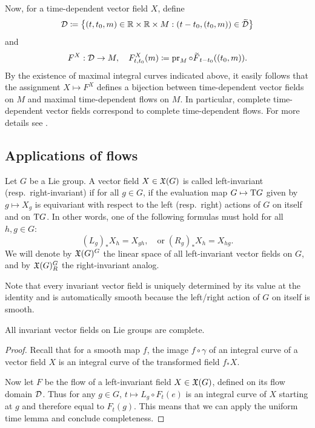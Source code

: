 \begin{rem}
    Now, for a time-dependent vector field $X$, define 
    \[\calD\coloneqq \left\{(t,t_0,m)\in\bbR\times\bbR\times M:(t-t_0,(t_0,m))\in\wt\calD\right\}\]
    and 
    \[F^X:\calD\to M,\quad F^X_{t,t_0}(m)\coloneqq \pr_M\circ \wt{F}_{t-t_0}((t_0,m)).\]
    By the existence of maximal integral curves indicated above, it easily follows that the assignment $X\mapsto F^X$ defines a bijection between time-dependent vector fields on $M$ and maximal time-dependent flows on $M$. In particular, complete time-dependent vector fields correspond to complete time-dependent flows. For more details see \cite[Sec.~3.4]{RS1}.
\end{rem}













\subsection{Applications of flows}\label{sec: applications of flows}



\begin{defn}
    Let $G$ be a Lie group. A vector field $X\in\mathfrak{X}(G)$ is called left-invariant (resp.~right-invariant) if for all $g\in G$, if the evaluation map $G\mapsto \mathrm{T} G$ given by $g\mapsto X_g$ is equivariant with respect to the left (resp.~right) actions of $G$ on itself and on $\mathrm{T} G$. In other words, one of the following formulas must hold for all $h,g\in G$:
    \[(L_g)_{\ast}X_h=X_{gh},\quad \text{or}\; (R_g)_{\ast}X_h=X_{hg}.\]
    We will denote by $\mathfrak{X}(G)^G$ the linear space of all left-invariant vector fields on $G$, and by $\mathfrak{X}(G)^G_R$ the right-invariant analog.
\end{defn}

Note that every invariant vector field is uniquely determined by its value at the identity and is automatically smooth because the left/right action of $G$ on itself is smooth.

\begin{thm}\label{thm invariant fields are complete}
    All invariant vector fields on Lie groups are complete.
\end{thm}
\begin{proof}
    Recall that for a smooth map $f$, the image $f\circ\gamma$ of an integral curve of a vector field $X$ is an integral curve of the transformed field $f_\ast X$. 
    
    Now let $F$ be the flow of a left-invariant field $X\in \mathfrak{X}(G)$, defined on its flow domain $\mathcal{D}$. Thus for any $g\in G$, $t\mapsto L_g\circ F_t(e)$ is an integral curve of $X$ starting at $g$ and therefore equal to $F_t(g)$. This means that we can apply the uniform time lemma and conclude completeness.
\end{proof}

